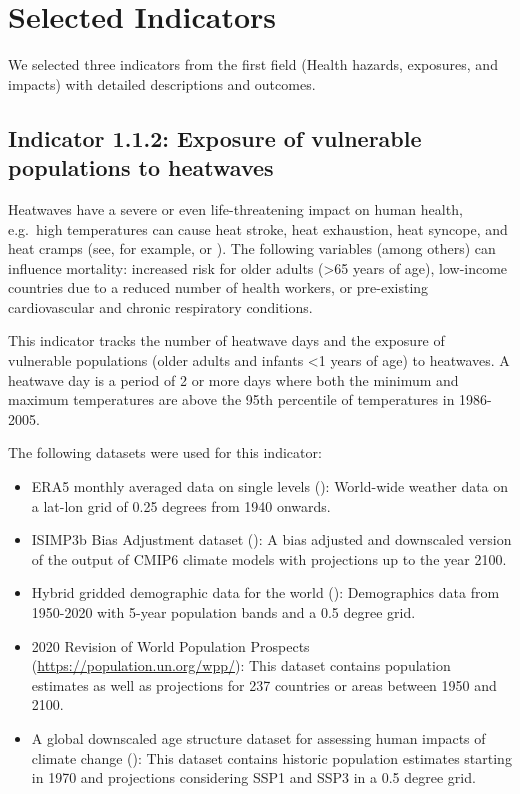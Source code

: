 \documentclass[
]{krantz}
\providecommand{\tightlist}{%
  \setlength{\itemsep}{0pt}\setlength{\parskip}{0pt}}
\begin{document}
\section{Selected Indicators}\label{selected-indicators}

We selected three indicators from the first field (Health hazards, exposures, and impacts) with detailed descriptions and outcomes.

\subsection{Indicator 1.1.2: Exposure of vulnerable populations to heatwaves}\label{indicator-1.1.2-exposure-of-vulnerable-populations-to-heatwaves}

Heatwaves have a severe or even life-threatening impact on human health, e.g.~high temperatures can cause heat stroke, heat exhaustion, heat syncope, and heat cramps (see, for example, \citet{alahamad2023} or \citet{chambers2020a}). The following variables (among others) can influence mortality: increased risk for older adults (\textgreater65 years of age), low-income countries due to a reduced number of health workers, or pre-existing cardiovascular and chronic respiratory conditions.

This indicator tracks the number of heatwave days and the exposure of vulnerable populations (older adults and infants \textless1 years of age) to heatwaves. A heatwave day is a period of 2 or more days where both the minimum and maximum temperatures are above the 95th percentile of temperatures in 1986-2005.

The following datasets were used for this indicator:

\begin{itemize}
\tightlist
\item
  ERA5 monthly averaged data on single levels (\citet{hersbach2020}): World-wide weather data on a lat-lon grid of 0.25 degrees from 1940 onwards.
\item
  ISIMP3b Bias Adjustment dataset (\citet{lange2021}): A bias adjusted and downscaled version of the output of CMIP6 climate models with projections up to the year 2100.
\item
  Hybrid gridded demographic data for the world (\citet{chambers2020b}): Demographics data from 1950-2020 with 5-year population bands and a 0.5 degree grid.
\item
  2020 Revision of World Population Prospects (\url{https://population.un.org/wpp/}): This dataset contains population estimates as well as projections for 237 countries or areas between 1950 and 2100.
\item
  A global downscaled age structure dataset for assessing human impacts of climate change (\citet{briggs2021}): This dataset contains historic population estimates starting in 1970 and projections considering SSP1 and SSP3 in a 0.5 degree grid.
\end{itemize}
\end{document}
